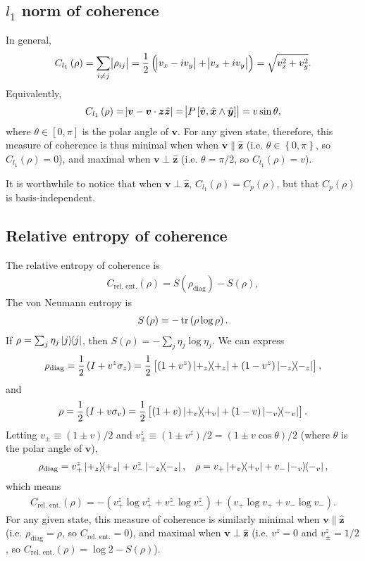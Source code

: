\documentclass[11pt]{article}
\renewcommand{\t}{\text} %
\newcommand{\f}[2]{\dfrac{#1}{#2}} %
\newcommand{\p}[1]{\left(#1\right)} %
\renewcommand{\sp}[1]{\left[#1\right]} %
\renewcommand{\set}[1]{\left\{#1\right\}} %
\renewcommand{\v}{\bm} %
\newcommand{\uv}[1]{\hat{\v{#1}}} %
\renewcommand{\c}{\cdot} %
\newcommand{\w}{\wedge} %
\begin{document}
\subsection*{$l_1$ norm of coherence}

In general,
\begin{align}
  C_{l_1}\p\rho=\sum_{i\ne j}\abs{\rho_{ij}}
  =\f12\p{\abs{v_x-iv_y}+\abs{v_x+iv_y}}=\sqrt{v_x^2+v_y^2}.
\end{align}
Equivalently,
\begin{align}
  C_{l_1}\p\rho=\abs{\v v-\v v\c\v z\uv z}
  =\abs{P\sp{\uv v,\uv x\w\uv y}}=v\sin\theta,
\end{align}
where $\theta\in\sp{0,\pi}$ is the polar angle of $\v v$. For any
given state, therefore, this measure of coherence is thus minimal when
when $\v v\parallel\uv z$ (i.e. $\theta\in\set{0,\pi}$, so
$C_{l_1}\p\rho=0$), and maximal when $\v v\perp\uv z$
(i.e. $\theta=\pi/2$, so $C_{l_1}\p\rho=v$).

It is worthwhile to notice that when $\v v\perp\uv z$,
$C_{l_1}\p\rho=C_p\p\rho$, but that $C_p\p\rho$ is
basis-independent.

\subsection*{Relative entropy of coherence}

The relative entropy of coherence is
\begin{align}
  C_{\t{rel. ent.}}\p\rho=S\p{\rho_{\t{diag}}}-S\p\rho,
\end{align}
The von Neumann entropy is
\begin{align}
  S\p\rho=-\tr\p{\rho\log\rho}.
\end{align}
If $\rho=\sum_j\eta_j\op j$, then $S\p\rho=-\sum_j\eta_j\log\eta_j$. We
can express
\begin{align}
  \rho_{\t{diag}}=\f12\p{I+v^z\sigma_z}
  =\f12\sp{\p{1+v^z}\op{+_z}+\p{1-v^z}\op{-_z}},
\end{align}
and
\begin{align}
  \rho=\f12\p{I+v\sigma_v}
  =\f12\sp{\p{1+v}\op{+_v}+\p{1-v}\op{-_v}}.
\end{align}
Letting $v_\pm\equiv \p{1\pm v}/2$ and $v^z_\pm\equiv\p{1\pm
  v^z}/2=\p{1\pm v\cos\theta}/2$ (where $\theta$ is the polar angle of
$\v v$),
\begin{align}
  \rho_{\t{diag}}=v^z_+\op{+_z}+v^z_-\op{-_z}, &&
  \rho=v_+\op{+_v}+v_-\op{-_v},
\end{align}
which means
\begin{align}
  C_{\t{rel. ent.}}\p\rho
  =-\p{v^z_+\log v^z_++v^z_-\log v^z_-}+\p{v_+\log v_++v_-\log v_-}.
\end{align}
For any given state, this measure of coherence is similarly minimal
when $\v v\parallel\uv z$ (i.e. $\rho_{\t{diag}}=\rho$, so
$C_{\t{rel. ent.}}=0$), and maximal when $\v v\perp\uv z$ (i.e.
$v^z=0$ and $v^z_\pm=1/2$, so $C_{\t{rel. ent.}}\p\rho=\log2-S\p\rho$).
\end{document}
